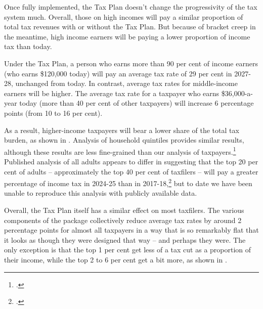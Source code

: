 \documentclass[submission]{grattan}\usepackage[]{graphicx}\usepackage[]{color}
\begin{document}
Once fully implemented, the Tax Plan doesn't change the progressivity of the tax system much. Overall, those on high incomes will pay a similar proportion of total tax revenues with or without the Tax Plan. But because of bracket creep in the meantime, high income earners will be paying a lower proportion of income tax than today.





Under the Tax Plan, a person who earns more than 90 per cent of income earners (who earns \$120,000 today) will pay an average tax rate of 29 per cent in 2027-28, unchanged from today. In contrast, average tax rates for middle-income earners will be higher. The average tax rate for a taxpayer who earns \$36,000-a-year today (more than 40 per cent of other taxpayers) will increase 6 percentage points (from 10 to 16 per cent).

As a result, higher-income taxpayers will bear a lower share of the total tax burden, as shown in . Analysis of household quintiles provides similar results, although these results are less fine-grained than our analysis of taxpayers.\footcite{Phillips2018}
Published analysis of all adults appears to differ in suggesting that the top 20 per cent of adults -- approximately the top 40 per cent of taxfilers -- will pay a greater percentage of income tax in 2024-25 than in 2017-18,\footcite{Greber} but to date we have been unable to reproduce this analysis with publicly available data.

Overall, the Tax Plan itself has a similar effect on most taxfilers. The various components of the package collectively reduce average tax rates by around 2 percentage points for almost all taxpayers in a way that is so remarkably flat that it looks as though they were designed that way -- and perhaps they were. The only exception is that the top 1 per cent get less of a tax cut as a proportion of their income, while the top 2 to 6 per cent get a bit more, as shown in .
\end{document}
